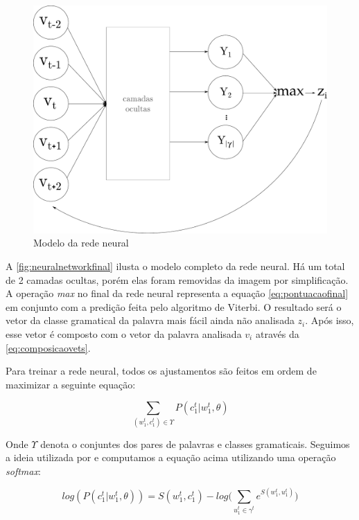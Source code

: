 \begin{figure}[htb]
	  \caption{Modelo da rede neural}\label{fig:neuralnetworkfinal}
	  \begin{center}
	      \includegraphics[scale=0.4]{img/neuralnetworkfinal.pdf}
	  \end{center}
\end{figure}

A \autoref{fig:neuralnetworkfinal} ilusta o modelo completo da rede neural. Há um total de 2 camadas ocultas, porém elas foram removidas da imagem por simplificação. A operação \textit{max} no final da rede neural representa a equação \autoref{eq:pontuacaofinal} em conjunto com a predição feita pelo algoritmo de Viterbi. O resultado será o vetor da classe gramatical da palavra mais fácil ainda não analisada $z_i$. Após isso, esse vetor é composto com o vetor da palavra analisada $v_i$ através da \autoref{eq:composicaovets}.

Para treinar a rede neural, todos os ajustamentos são feitos em ordem de maximizar a seguinte equação:

\begin{equation}
\sum\limits_{(w_1^t,c_1^t) \in \Upsilon} P(c_1^t|w_1^t,\theta) \nonumber
\end{equation}

Onde $\Upsilon$ denota o conjuntes dos pares de palavras e classes gramaticais. Seguimos a ideia utilizada por  e computamos a equação acima utilizando uma operação \textit{softmax}:

\begin{equation}
log(P(c_1^t|w_1^t,\theta)) = S(w_1^t, c_1^t) - log\Bigg(\sum\limits_{u_1^t \in \gamma^t} e^{S(w_1^t, u_1^t)} \Bigg) \nonumber
\end{equation}


